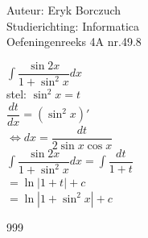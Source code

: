 \documentclass[a4paper]{article}
\begin{document}
  
\noindent \large Auteur: Eryk Borczuch \\
\noindent \large Studierichting: Informatica\\
\noindent \large Oefeningenreeks 4A nr.49.8\\

\medskip

\normalsize

$\displaystyle \int \dfrac{\sin2x}{1+\sin^2x}dx$\\

stel: $\sin^2x = t$\\

$\dfrac{dt}{dx} = (\sin^2x)'$\\

$\Leftrightarrow dx = \dfrac{dt}{2\sin x \cos x} $\\

$\displaystyle \int \dfrac{\sin2x}{1+\sin^2x}dx = \int \dfrac{dt }{1+t}$\\

$ = \ln |1+t|+c$\\

$ = \ln |1+\sin^2x|+c$

\begin{thebibliography}{999}
\end{thebibliography}
\end{document}
